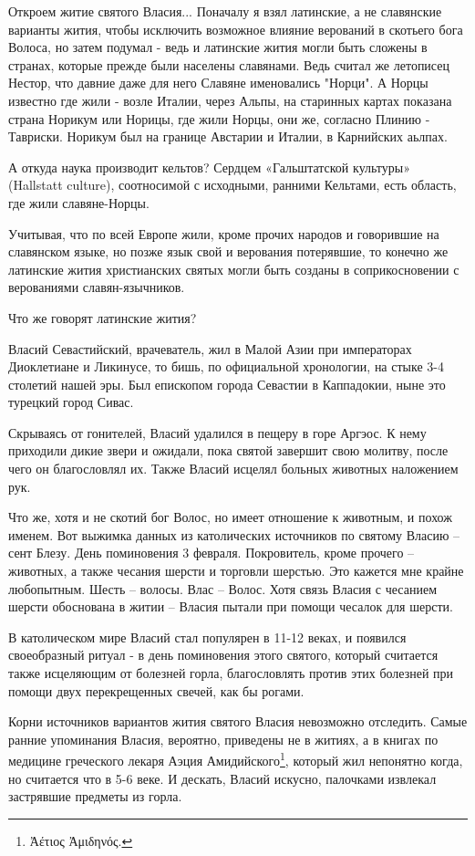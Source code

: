 \documentclass[a5paper,11pt,openany]{article}
\begin{document}
    Откроем житие святого Власия... Поначалу я взял латинские, а не славянские варианты жития, чтобы исключить возможное влияние верований в скотьего бога Волоса, но затем подумал - ведь и латинские жития могли быть сложены в странах, которые прежде были населены славянами. Ведь считал же летописец Нестор, что давние даже для него Славяне именовались "Норци". А Норцы известно где жили - возле Италии, через Альпы, на старинных картах показана страна Норикум или Норицы, где жили Норцы, они же, согласно Плинию - Тавриски. Норикум был на границе Австарии и Италии, в Карнийских аьлпах. 

   А откуда наука производит кельтов? Сердцем «Гальштатской культуры» (Hallstatt
culture), соотносимой с исходными, ранними Кельтами, есть область, где жили славяне-Норцы.

   Учитывая, что по всей Европе жили, кроме прочих народов и говорившие на славянском языке, но позже язык свой и верования потерявшие, то конечно же латинские жития христианских святых могли быть созданы в соприкосновении с верованиями славян-язычников.

 Что же говорят латинские жития?

   Власий Севастийский, врачеватель, жил в Малой Азии при императорах Диоклетиане и Ликинусе, то бишь, по официальной хронологии, на стыке 3-4 столетий нашей эры. Был епископом города Севастии в Каппадокии, ныне это турецкий город Сивас.

  Скрываясь от гонителей, Власий удалился в пещеру в горе Аргэос. К нему приходили дикие звери и ожидали, пока святой завершит свою молитву, после чего он благословлял их. Также Власий исцелял больных животных наложением рук.

  Что же, хотя и не скотий бог Волос, но имеет отношение к животным, и похож именем. Вот выжимка данных из католических источников по святому Власию – сент Блезу. День поминовения 3 февраля. Покровитель, кроме прочего – животных, а также чесания шерсти и торговли шерстью. Это кажется мне крайне любопытным. Шесть – волосы. Влас – Волос. Хотя связь Власия с чесанием шерсти обоснована в житии – Власия пытали при помощи чесалок для шерсти.

   В католическом мире Власий стал популярен в 11-12 веках, и появился своеобразный ритуал - в день поминовения этого святого, который считается также исцеляющим от болезней горла, благословлять против этих болезней при помощи двух перекрещенных свечей, как бы рогами.

   Корни источников вариантов жития святого Власия невозможно отследить. Самые ранние упоминания Власия, вероятно, приведены не в житиях, а в книгах по медицине греческого лекаря Аэция Амидийского\footnote{Ἀέτιος Ἀμιδηνός.}, который жил непонятно когда, но считается что в 5-6 веке. И дескать, Власий искусно, палочками извлекал застрявшие предметы из горла. 
\end{document}
